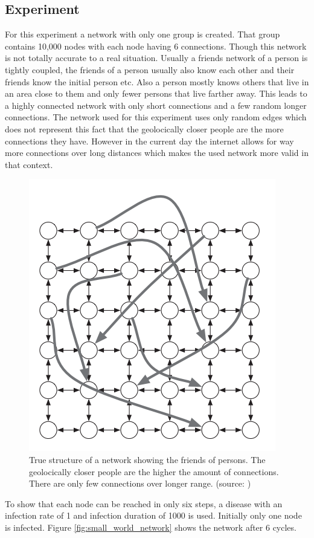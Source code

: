 \subsection{Experiment}
For this experiment a network with only one group is created. That group
contains 10,000 nodes with each node having 6
connections. Though this network is not totally accurate to a real situation. Usually 
a friends network of a person is tightly coupled, the friends of a person usually also know
each other and their friends know the initial person etc. Also a person mostly knows
others that live in an area close to them and only fewer persons that live farther away.
This leads to a highly connected network with only short connections and a few random longer connections.
The network used for this experiment uses only random edges which does not represent this
fact that the geolocically closer people are the more connections they have. However in the
current day the internet allows for way more connections over long distances which makes
the used network more valid in that context.

\begin{figure}
    \centering
    \includegraphics[width=0.5\linewidth]{images/sw_true_network.png}
    \caption{True structure of a network showing the friends of persons. The
    geolocically closer people are the higher the amount of connections. There
    are only few connections over longer range. (source: \cite{networks})}
    \label{fig:oscillation}
\end{figure}


To show that each node can be reached in only six steps, a disease with an infection rate
of 1 and infection duration of 1000 is used. Initially only one
node is infected. Figure \ref{fig:small_world_network} shows the network after 6 cycles.

